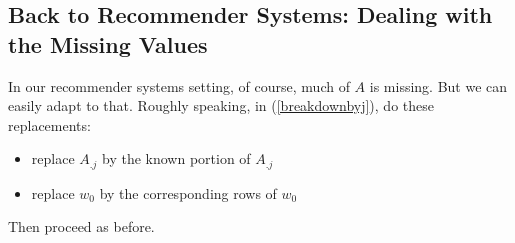 \subsection{Back to Recommender Systems:  Dealing with the Missing Values}

In our recommender systems setting, of course, much of $A$ is missing.
But we can easily adapt to that.  Roughly speaking, in
(\ref{breakdownbyj}), do these replacements:

\begin{itemize}

\item replace $A_{.j}$ by the known portion of $A_{.j}$

\item replace $w_0$ by the corresponding rows of $w_0$

\end{itemize} 

Then proceed as before.  

% 
% 
% 
% 
% 
% 
% 
% 
% 


